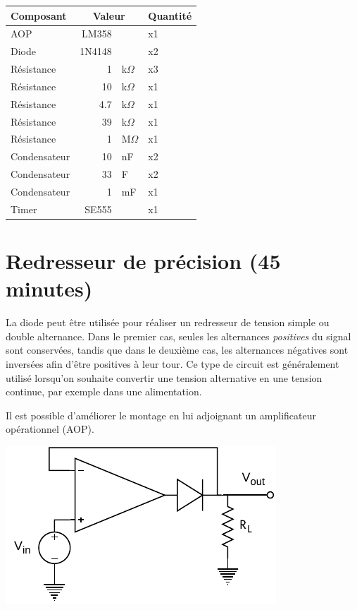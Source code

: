 \documentclass{../../template/labo}
\begin{document}
\begin{center}
	\begin{tabular}{p{}rlp{}}
		Composant & \multicolumn{2}{c}{Valeur} & Quantité \\\toprule
		\multirow{1}{*}{AOP} & LM358 & & x1 \\\midrule
		\multirow{1}{*}{Diode} & 1N4148 & & x2 \\\midrule
		\multirow{1}{*}{Résistance} 	& 1 & k$\Omega$ & x3 \\\midrule
		\multirow{1}{*}{Résistance} 	& 10 & k$\Omega$ & x1 \\\midrule
		\multirow{1}{*}{Résistance} 	& 4.7 & k$\Omega$ & x1 \\\midrule
		\multirow{1}{*}{Résistance} 	& 39 & k$\Omega$ & x1 \\\midrule
		\multirow{1}{*}{Résistance} 	& 1 & M$\Omega$ & x1 \\\midrule
		\multirow{1}{*}{Condensateur} 	& 10 & nF & x2 \\\midrule
		\multirow{1}{*}{Condensateur} 	& 33 & \textmu F & x2 \\\midrule
		\multirow{1}{*}{Condensateur} 	& 1 & mF & x1 \\\midrule
		\multirow{1}{*}{Timer} 	& SE555 &  & x1 \\\bottomrule
	\end{tabular}
\end{center}

\section{Redresseur de précision (45 minutes)}
La diode peut être utilisée pour réaliser un redresseur de tension simple ou double alternance.
Dans le premier cas, seules les alternances \textit{positives} du signal sont conservées, tandis que dans le deuxième cas, les alternances négatives sont inversées afin d'être positives à leur tour.
Ce type de circuit est généralement utilisé lorsqu'on souhaite convertir une tension alternative en une tension continue, par exemple dans une alimentation.

Il est possible d'améliorer le montage en lui adjoignant un amplificateur opérationnel (AOP).
\begin{center}
	\includegraphics[width=.5\textwidth]{precision-rectifier.pdf}
\end{center}
\end{document}
